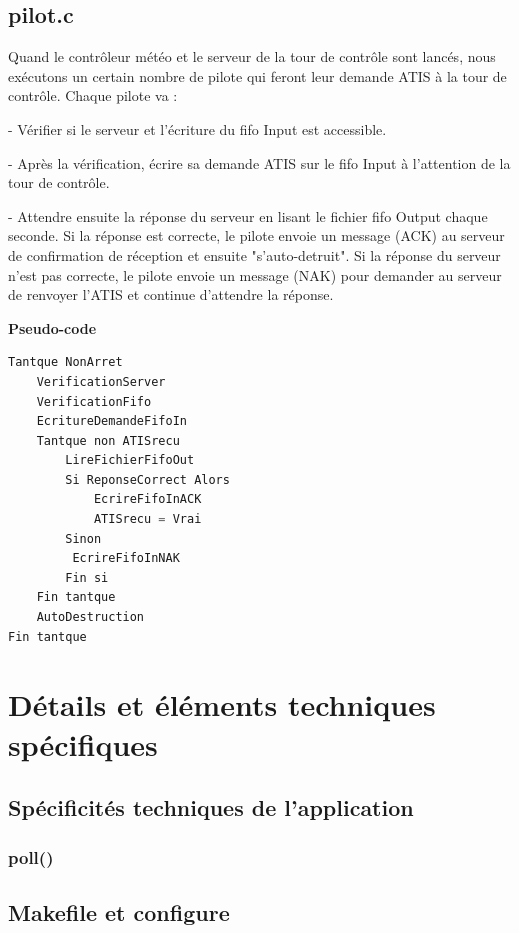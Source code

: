 \documentclass{report}
\begin{document}
{	\section{pilot.c}
		
 Quand le contrôleur météo et le serveur de la tour de contrôle sont lancés, nous exécutons un certain nombre de pilote qui feront leur demande ATIS à la tour de contrôle.
		Chaque pilote va : 
		
		- Vérifier si le serveur et l'écriture du fifo Input est accessible.
		
		- Après la vérification, écrire sa demande ATIS sur le fifo Input à l'attention de la tour de contrôle.
		
		- Attendre ensuite la réponse du serveur en lisant le fichier fifo Output chaque seconde. Si la réponse est correcte, le pilote envoie un message (ACK) au serveur de confirmation de réception et ensuite "s'auto-detruit".  Si la réponse du serveur n'est pas correcte, le pilote envoie un message (NAK) pour demander au serveur de renvoyer l'ATIS et continue d'attendre la réponse.
\newline

\textbf{Pseudo-code}

\begin{lstlisting}[language=C]
Tantque NonArret
	VerificationServer
	VerificationFifo
	EcritureDemandeFifoIn
	Tantque non ATISrecu
		LireFichierFifoOut
		Si ReponseCorrect Alors
			EcrireFifoInACK
			ATISrecu = Vrai 
		Sinon
		 EcrireFifoInNAK
		Fin si
	Fin tantque
	AutoDestruction
Fin tantque 
\end{lstlisting}

\chapter{Détails et éléments techniques spécifiques}

	\section{Spécificités techniques de l'application}

		\subsection{poll()}

	\section{Makefile et configure}

}
\end{document}
